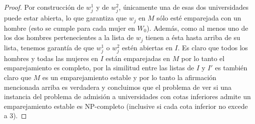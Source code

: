 \begin{proof}
Por construcción de $w_j^1$ y de $w_j^2$, únicamente una de esas dos universidades puede estar abierta, lo que garantiza que $w_j$ en $M$ sólo esté emparejada con un hombre (esto se cumple para cada mujer en $W_0$). Además, como al menos uno de los dos hombres pertenecientes a la lista de $w_j$ tienen a ésta hasta arriba de su lista, tenemos garantía de que $w_j^1$ o $w_j^2$ estén abiertas en $I$. Es claro que todos los hombres y todas las mujeres en $I$ están emparejadas en $M$ por lo tanto el emparejamiento es completo, por la similitud entre las listas de $I$ y $I'$ es también claro que $M$ es un emparejamiento estable y por lo tanto la afirmación mencionada arriba es verdadera y concluimos que el problema de ver si una instancia del problema de admisión a universidades con cotas inferiores admite un emparejamiento estable es NP-completo (inclusive si cada cota inferior no excede a 3).
\end{proof}

